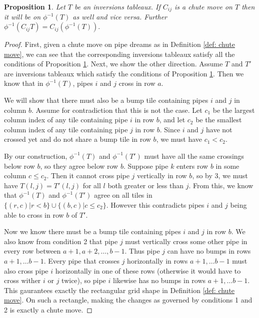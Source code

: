 \documentclass{article}
\newtheorem{proposition}[theorem]{Proposition}
\theoremstyle{definition}
\begin{document}
\begin{proposition}
    \label{Prop:chute move}
    Let $T$ be an inversions tableaux.
     If $C_{ij}$ is a chute move on $T$ then it will be on $\phi^{-1}(T)$ as well and vice versa. Further $\phi^{-1}(C_{ij}T)= C_{ij}(\phi^{-1}(T)).$
    
\end{proposition}

\begin{proof}
    First, given a chute move on pipe dreams as in Definition \ref{def: chute move}, we can see that the corresponding inversions tableaux satisfy all the conditions of Proposition \ref{Prop:chute move}. Next, we show the other direction. Assume $T$ and $T'$ are inversions tableaux which satisfy the conditions of Proposition \ref{Prop:chute move}. Then we know that in $\phi^{-1}(T)$, pipes $i$ and $j$ cross in row $a$. 
    
    We will show that there must also be a bump tile containing pipes $i$ and $j$ in column $b$. Assume for contradiction that this is not the case. Let $c_1$ be the largest column index of any tile containing pipe $i$ in row $b$, and let $c_2$ be the smallest column index of any tile containing pipe $j$ in row $b$. Since $i$ and $j$ have not crossed yet and do not share a bump tile in row $b$, we must have $c_1 < c_2$.

    By our construction, $\phi^{-1}(T)$ and $\phi^{-1}(T')$ must have all the same crossings below row $b$, so they agree below row $b$. Suppose pipe $k$ enters row $b$ in some column $c \leq c_2$. Then it cannot cross pipe $j$ vertically in row $b$, so by 3, we must have $T(l,j)=T'(l,j)$ for all $l$ both greater or less than $j$. From this, we know that $\phi^{-1}(T)$ and $\phi^{-1}(T')$ agree on all tiles in $\{(r,c)| r<b \} \cup \{(b,c)| c \leq c_2 \}$. However this contradicts pipes $i$ and $j$ being able to cross in row $b$ of $T'$.


    Now we know there must be a bump tile containing pipes $i$ and $j$ in row $b$. We also know from condition 2 that pipe $j$ must vertically cross some other pipe in every row between $a+1, a+2, \dots, b-1$. Thus pipe $j$ can have no bumps in rows $a+1, \dots b-1$. Every pipe that crosses $j$ horizontally in rows $a+1, \dots b-1$ must also cross pipe $i$ horizontally in one of these rows (otherwise it would have to cross wither $i$ or $j$ twice), so pipe $i$ likewise has no  bumps in rows $a+1, \dots b-1$. This gaurantees exactly the rectangular grid shape in Definition \ref{def: chute move}. On such a rectangle, making the changes as governed by conditions 1 and 2 is exactly a chute move.
\end{proof}
\end{document}
